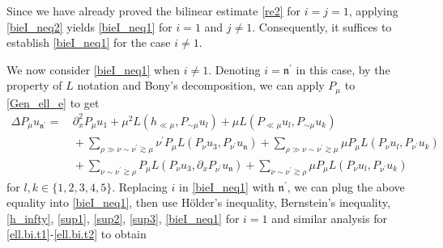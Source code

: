 \documentclass[11pt,letterpaper,reqno]{amsart}
\numberwithin{equation}{section}
\theoremstyle{definition}
\theoremstyle{remark}
\begin{document}
Since we have already proved the bilinear estimate \eqref{re2} for \(i=j=1\), applying \eqref{bieI_neq2} yields \eqref{bieI_neq1} for \(i=1\) and \(j\neq 1\).  Consequently,  it suffices to establish \eqref{bieI_neq1} for the case \(i\neq 1\).

We now consider \eqref{bieI_neq1} when 
 \(i\neq 1\). Denoting $i = \mathfrak{n}^\prime$ in this case, 
by the property of \(L\) notation and Bony's decomposition,
 we can   apply \( P_{\mu} \) to \eqref{Gen_ell_e} to get
\begin{align}
	 \Delta 	P_{\mu}   u_{\mathfrak{n}^\prime}=&  \,  \partial_x^2 P_{\mu}u_1+   \mu^2  L( h_{\ll \mu},   P_{\sim \mu} u_{l})+   \mu  L( P_{\ll \mu} u_l, P_{\sim \mu} u_{k}  )  \label{P_NJ}  \\
 &\, +  \sum_{\rho \gg \nu \sim \nu^\prime \gtrsim \mu} \nu^\prime P_{\mu }    L (  P_\nu u_3,     P_{\nu^\prime } 
 u_{\mathfrak{n}})+ \sum_{\rho \gg \nu \sim \nu^\prime \gtrsim \mu} 
 \mu P_{\mu} L (P_{\nu} u_l,     P_{\nu^\prime }
u_k)  \nonumber\\
 &\, + \sum_{\nu \sim \nu^\prime \gtrsim \rho}P_{\mu }    L (  P_\nu u_3,   \partial_x P_{\nu^\prime } 
 u_{\mathfrak{n}})+ \sum_{\nu \sim \nu^\prime \gtrsim \rho} 
 \mu P_{\mu} L (P_{\nu} u_l,     P_{\nu^\prime }
u_k)  \nonumber
\end{align}
for \(l,k\in \{1,2,3,4,5\}\).   Replacing \( i\) in \eqref{bieI_neq1} with \( \mathfrak{n}^\prime \),  we can plug the above equality into  \eqref{bieI_neq1}, then use 
   H\"older's inequality, Bernstein's inequality, \eqref{h_infty}, \eqref{sup1}, \eqref{sup2}, \eqref{sup3},   \eqref{bieI_neq1} for \(i=1\) and similar  analysis for \eqref{ell.bi.t1}-\eqref{ell.bi.t2} to obtain
\end{document}

